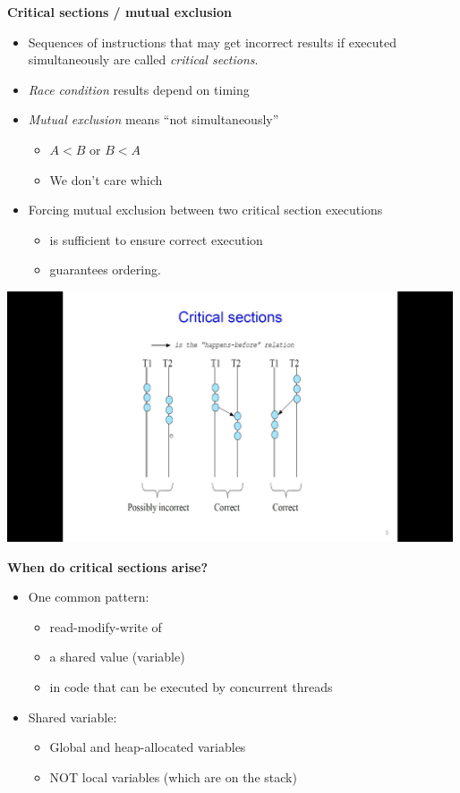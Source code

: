 \documentclass[11pt,a4paper]{article}
\begin{document}
\textbf{Critical sections / mutual exclusion}
\begin{itemize}
    \item Sequences of instructions that may get incorrect results if executed simultaneously
        are called \emph{critical sections}.
    \item \emph{Race condition} results depend on timing
    \item \emph{Mutual exclusion} means ``not simultaneously''
        \begin{itemize}
            \item $A < B$ or $B < A$
            \item We don't care which
        \end{itemize}
    \item Forcing mutual exclusion between two critical section executions
        \begin{itemize}
            \item is sufficient to ensure correct execution
            \item guarantees ordering.
        \end{itemize}
\end{itemize}

\includegraphics[height=280]{critical-sections.jpg}

\textbf{When do critical sections arise?}
\begin{itemize}
    \item One common pattern:
        \begin{itemize}
            \item read-modify-write of
            \item a shared value (variable)
            \item in code that can be executed by concurrent threads
        \end{itemize}
    \item Shared variable:
        \begin{itemize}
            \item Global and heap-allocated variables
            \item NOT local variables (which are on the stack)
        \end{itemize}
\end{itemize}
\end{document}
